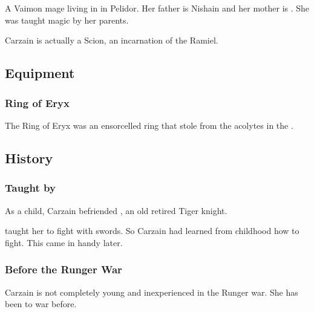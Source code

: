 \section{\CarzainShachar}
A Vaimon mage living in \Redglen{} in Pelidor. 
Her father is Nishain \Shachar{} and her mother is \Roanne{} \Deracille. 
She was taught magic by her parents. 

Carzain is actually a Scion, an incarnation of the \Malach{} Ramiel. 









\subsection{Equipment}





\subsubsection{Ring of Eryx}
The Ring of Eryx was an ensorcelled ring that \CarzainShachar stole from the acolytes in the .









\subsection{History}





\subsubsection[Taught by Weylon]{Taught by {\Weylon}}
As a child, Carzain befriended , an old retired Tiger knight. 

\Weylon{} taught her to fight with swords. 
So Carzain had learned from childhood how to fight. 
This came in handy later. 





\subsubsection{Before the Runger War}
Carzain is not completely young and inexperienced in the Runger war. 
She has been to war before. 

